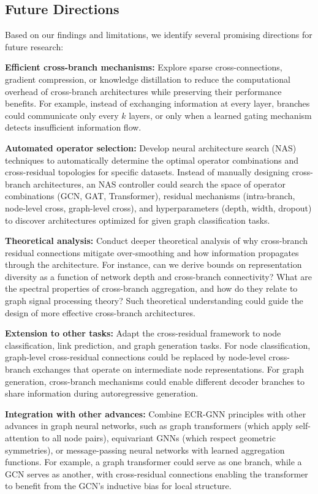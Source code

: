 \subsection{Future Directions}

Based on our findings and limitations, we identify several promising directions for future research:

\textbf{Efficient cross-branch mechanisms:} Explore sparse cross-connections, gradient compression, or knowledge distillation to reduce the computational overhead of cross-branch architectures while preserving their performance benefits. For example, instead of exchanging information at every layer, branches could communicate only every $k$ layers, or only when a learned gating mechanism detects insufficient information flow.

\textbf{Automated operator selection:} Develop neural architecture search (NAS) techniques to automatically determine the optimal operator combinations and cross-residual topologies for specific datasets. Instead of manually designing cross-branch architectures, an NAS controller could search the space of operator combinations (GCN, GAT, Transformer), residual mechanisms (intra-branch, node-level cross, graph-level cross), and hyperparameters (depth, width, dropout) to discover architectures optimized for given graph classification tasks.

\textbf{Theoretical analysis:} Conduct deeper theoretical analysis of why cross-branch residual connections mitigate over-smoothing and how information propagates through the architecture. For instance, can we derive bounds on representation diversity as a function of network depth and cross-branch connectivity? What are the spectral properties of cross-branch aggregation, and how do they relate to graph signal processing theory? Such theoretical understanding could guide the design of more effective cross-branch architectures.

\textbf{Extension to other tasks:} Adapt the cross-residual framework to node classification, link prediction, and graph generation tasks. For node classification, graph-level cross-residual connections could be replaced by node-level cross-branch exchanges that operate on intermediate node representations. For graph generation, cross-branch mechanisms could enable different decoder branches to share information during autoregressive generation.

\textbf{Integration with other advances:} Combine ECR-GNN principles with other advances in graph neural networks, such as graph transformers (which apply self-attention to all node pairs), equivariant GNNs (which respect geometric symmetries), or message-passing neural networks with learned aggregation functions. For example, a graph transformer could serve as one branch, while a GCN serves as another, with cross-residual connections enabling the transformer to benefit from the GCN's inductive bias for local structure.

